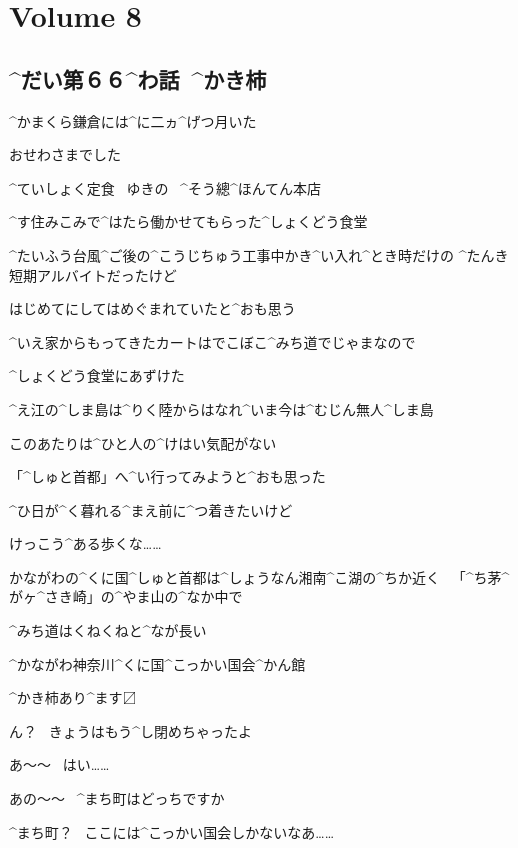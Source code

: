 \section{Volume 8}

\subsection{^{だい}{第}６６^{わ}{話}\ ^{かき}{柿}}

\page[4]
\Alpha ^{かまくら}{鎌倉}には^{に}{二}ヵ^{げつ}{月}いた

\Alpha おせわさまでした

\page
\Sign ^{ていしょく}{定食}
\ ゆきの
\ ^{そう}{總}^{ほんてん}{本店}

\Alpha ^{す}{住}みこみで^{はたら}{働}かせてもらった^{しょくどう}{食堂}

\Alpha ^{たいふう}{台風}^{ご}{後}の^{こうじちゅう}{工事中}かき^{い}{入}れ^{とき}{時}だけの
^{たんき}{短期}アルバイトだったけど

\Alpha はじめてにしてはめぐまれていたと^{おも}{思}う

\page[7]
\Alpha ^{いえ}{家}からもってきたカートはでこぼこ^{みち}{道}でじゃまなので

\Alpha ^{しょくどう}{食堂}にあずけた

\page
\Alpha ^{え}{江}の^{しま}{島}は^{りく}{陸}からはなれ^{いま}{今}は^{むじん}{無人}^{しま}{島}

\Alpha このあたりは^{ひと}{人}の^{けはい}{気配}がない

\page
\Alpha 「^{しゅと}{首都}」へ^{い}{行}ってみようと^{おも}{思}った

\Alpha ^{ひ}{日}が^{く}{暮}れる^{まえ}{前}に^{つ}{着}きたいけど

\Alpha けっこう^{ある}{歩}くな……

\Alpha かながわの^{くに}{国}^{しゅと}{首都}は^{しょうなん}{湘南}^{こ}{湖}の^{ちか}{近}く
\ 「^{ち}{茅}^{が}{ヶ}^{さき}{崎}」の^{やま}{山}の^{なか}{中}で

\Alpha ^{みち}{道}はくねくねと^{なが}{長}い

\page
\Sign ^{かながわ}{神奈川}^{くに}{国}^{こっかい}{国会}^{かん}{館}

\Sign ^{かき}{柿}あり^{ます}{〼}

\page
\Person ん？
\ きょうはもう^{し}{閉}めちゃったよ

\Alpha あ〜〜
\ はい……

\Alpha あの〜〜
\ ^{まち}{町}はどっちですか

\Person ^{まち}{町}？
\ ここには^{こっかい}{国会}しかないなあ……

